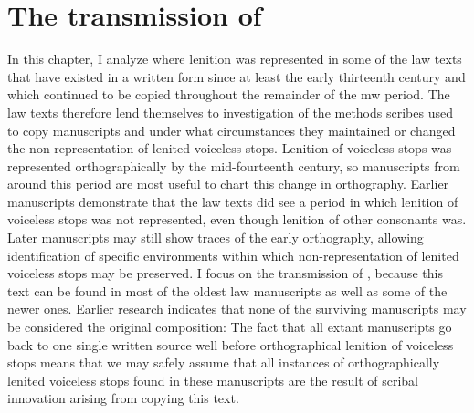 \chapter{The transmission of }
\label{cha:welsh-laws}

In this chapter, I analyze where lenition was represented in some of the law texts that have existed in a written form since at least the early thirteenth century and which continued to be copied throughout the remainder of the \gls{mw} period. The law texts therefore lend themselves to investigation of the methods  scribes used to copy manuscripts and under what circumstances they maintained or changed the non-representation of lenited voiceless stops.
Lenition of voiceless stops was represented orthographically by the mid-fourteenth century, so manuscripts from around this period are most useful to chart this change in orthography.
Earlier manuscripts  demonstrate that the law texts did see a period in which lenition of voiceless stops was not represented, even though lenition of other consonants was.
Later manuscripts may still show traces of the early orthography, allowing identification of specific environments within which non-representation of lenited voiceless stops may be preserved.
I focus on the transmission of , because this text can be found in most of the oldest law manuscripts as well as some of the newer ones. Earlier research indicates that none of the surviving manuscripts may be considered the original composition:
The fact that all extant manuscripts go back to one single written source well before orthographical lenition of voiceless stops means that we may safely assume that all instances of orthographically lenited voiceless stops found in these manuscripts are the result of scribal innovation arising from copying this text. 


